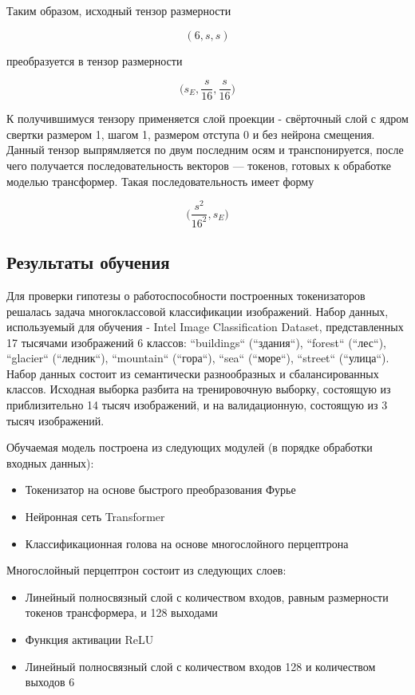 \documentclass[times,specification,annotation]{itmo-student-thesis}
\begin{document}
Таким образом, исходный тензор размерности

$$
(6, s, s)
$$

преобразуется в тензор размерности

$$
\Big(s_E, \dfrac{s}{16}, \dfrac{s}{16}\Big)
$$

К получившимуся тензору применяется слой проекции - свёрточный слой с ядром свертки размером 1, шагом 1, размером отступа 0 и без нейрона смещения. Данный тензор выпрямляется по двум последним осям и транспонируется, после чего получается последовательность векторов --- токенов, готовых к обработке моделью трансформер. Такая последовательность имеет форму

$$
\Big(\dfrac{s^2}{16^2}, s_E\Big)
$$

\subsection{Результаты обучения}

 Для проверки гипотезы о работоспособности построенных токенизаторов решалась задача многоклассовой классификации изображений. Набор данных, используемый для обучения - Intel Image Classification Dataset, представленных 17 тысячами изображений 6 классов: ``buildings`` (``здания``), ``forest`` (``лес``), ``glacier`` (``ледник``), ``mountain`` (``гора``), ``sea`` (``море``), ``street`` (``улица``). Набор данных состоит из семантически разнообразных и сбалансированных классов. Исходная выборка разбита на тренировочную выборку, состоящую из приблизительно 14 тысяч изображений, и на валидационную, состоящую из 3 тысяч изображений.

 Обучаемая модель построена из следующих модулей (в порядке обработки входных данных):

\begin{itemize}
    \item Токенизатор на основе быстрого преобразования Фурье
    \item Нейронная сеть Transformer
    \item Классификационная голова на основе многослойного перцептрона
\end{itemize}

Многослойный перцептрон состоит из следующих слоев:

\begin{itemize}
    \item Линейный полносвязный слой с количеством входов, равным размерности токенов трансформера, и 128 выходами
    \item Функция активации ReLU
    \item Линейный полносвязный слой с количеством входов 128 и количеством выходов 6
\end{itemize}
\end{document}
